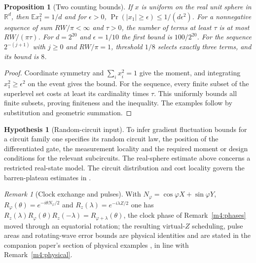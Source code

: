 \documentclass[11pt,reqno]{amsart}
\newtheorem{proposition}[theorem]{Proposition}
\theoremstyle{definition}
\newtheorem{hypothesis}[theorem]{Hypothesis}
\theoremstyle{remark}
\newtheorem{remark}[theorem]{Remark}
\numberwithin{equation}{section}
\begin{document}
\begin{proposition}[Two counting bounds]\label{m11:concentration}
If $x$ is uniform on the real unit sphere in $\mathbb R^d$,
then $\mathbb E x_1^2=1/d$ and for $\epsilon>0$,
$\Pr(|x_1|\ge\epsilon)\le 1/(d\epsilon^2)$.
For a nonnegative sequence of sum $RW/\pi<\infty$ and
$\tau>0$, the number of terms at least $\tau$ is at most
$RW/(\pi\tau)$. For $d=2^{20}$ and $\epsilon=1/10$ the
first bound is $100/2^{20}$. For the sequence $2^{-(j+1)}$
with $j\ge0$ and $RW/\pi=1$, threshold $1/8$ selects exactly
three terms, and its bound is $8$.
\end{proposition}
\begin{proof}
Coordinate symmetry and $\sum_i x_i^2=1$ give the moment,
and integrating $x_1^2\ge\epsilon^2$ on the event gives the bound.
For the sequence, every finite subset of the superlevel set
costs at least its cardinality times $\tau$. This uniformly
bounds all finite subsets, proving finiteness and the inequality.
The examples follow by substitution and geometric summation.
\end{proof}

\begin{hypothesis}[Random-circuit input]\label{m11:random-input}
To infer gradient fluctuation bounds for a circuit family one
specifies its random circuit law, the position of the differentiated
gate, the measurement locality and the required moment or design
conditions for the relevant subcircuits. The real-sphere estimate
above concerns a restricted real-state model. The circuit distribution
and cost locality govern the barren-plateau estimates in
\cite{m11:McClean,m11:Cerezo}.
\end{hypothesis}

\begin{remark}[Clock exchange and pulses]\label{m11:clock-pointer}
With $N_\varphi=\cos\varphi X+\sin\varphi Y$, $R_\varphi(\theta)=e^{-i\theta N_\varphi/2}$
and $R_z(\lambda)=e^{-i\lambda Z/2}$ one has
$R_z(\lambda)R_\varphi(\theta)R_z(-\lambda)=R_{\varphi+\lambda}(\theta)$, the clock
phase of Remark~\ref{m4:phases} moved through an equatorial rotation; the
resulting virtual-$Z$ scheduling, pulse areas and rotating-wave error bounds
are physical identities and are stated in the companion paper's section of
physical examples \cite{Companion}, in line with Remark~\ref{m4:physical}.
\end{remark}

\setcounter{section}{10}
\renewcommand{\thesection}{\arabic{section}}
\renewcommand{\theHsection}{\arabic{section}}
\end{document}
